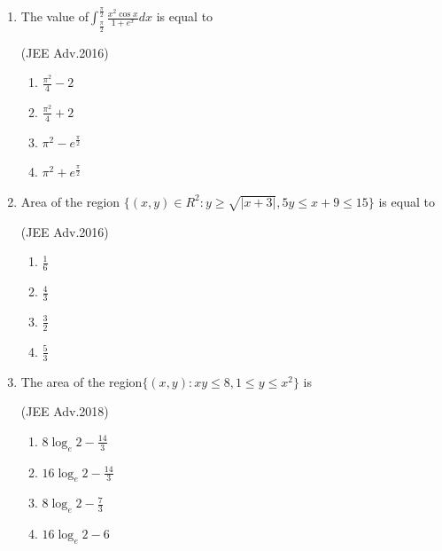 \documentclass[journal,12pt,twocolumn]{IEEEtran}
\theoremstyle{remark}
\begin{document}
\begin{enumerate}
		\hfill{(JEE Adv.2014)}
		\begin{enumerate}[label=(\alph*)]
			\item $\int_{0}^{log(1+\sqrt{2})}2(e^u+e^{-u})^{16} du$
			\item $\int_{0}^{log(1+\sqrt{2})}(e^u+e^{-u})^{17} du$
			\item $\int_{0}^{log(1+\sqrt{2})}(e^u-e^{-u})^{17} du$
			\item $\int_{0}^{log(1+\sqrt{2})}2(e^u-e^{-u})^{16} du$
		\end{enumerate}
	\item 
		The value of$\int_{\frac{\pi}{2}}^{\frac{\pi}{2}}\frac{x^2\cos x}{1+e^x} dx$ is equal to

		\hfill{(JEE Adv.2016)}
		\begin{enumerate}[label=(\alph*)]
			\item $\frac{\pi^2}{4}-2$
			\item $\frac{\pi^2}{4}+2$
                        \item $\pi^2-e^{\frac{\pi}{2}}$
			\item $\pi^2+e^{\frac{\pi}{2}}$
		\end{enumerate}
	\item
		Area of the region $\{(x,y)\in R^2:y\geq\sqrt{|x+3|},5y\leq x+9\leq15\}$ is equal to

		\hfill{(JEE Adv.2016)}
		\begin{enumerate}[label=(\alph*)]
			\item $\frac{1}{6}$
			\item $\frac{4}{3}$
			\item $\frac{3}{2}$
			\item $\frac{5}{3}$
		\end{enumerate}
	\item
		The area of the region$\{(x,y):xy\leq8,1\leq{y}\leq{x^2}\}$ is

		\hfill{(JEE Adv.2018)}
		\begin{enumerate}[label=(\alph*)]
			\item $8\log_e2-\frac{14}{3}$
			\item $16\log_e2-\frac{14}{3}$
			\item $8\log_e2-\frac{7}{3}$
			\item $16\log_e2-6$
		\end{enumerate}


\end{enumerate}
\end{document}
